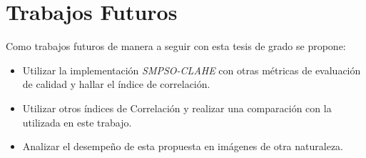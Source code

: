 \section{Trabajos Futuros}
Como trabajos futuros de manera a seguir con esta tesis de grado se propone: 

\begin{itemize}
\item Utilizar la implementación {\it SMPSO-CLAHE} con otras métricas de evaluación de calidad y hallar el índice de correlación.
\item Utilizar otros índices de Correlación y realizar una comparación con la utilizada en este trabajo.
\item Analizar el desempeño de esta propuesta en imágenes de otra naturaleza.
\end{itemize}

